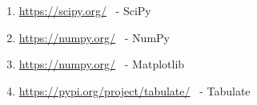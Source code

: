 \begin{enumerate}
\item \url{https://scipy.org/} \ - SciPy
\item \url{https://numpy.org/} \ - NumPy
\item \url{https://numpy.org/} \ - Matplotlib
\item \url{https://pypi.org/project/tabulate/} \ - Tabulate
\end{enumerate}
